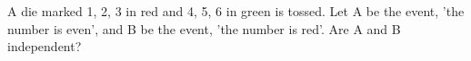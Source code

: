 \begin{flushleft}
A die marked 1, 2, 3 in red and 4, 5, 6 in green is tossed. Let A be the event, 'the number is even', and B be the event, 'the number is red'. Are A and B independent?
\end{flushleft}